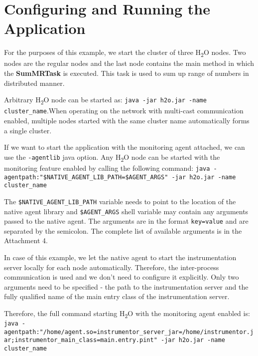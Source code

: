 \section{Configuring and Running the Application}
For the purposes of this example, we start the cluster of three H\textsubscript{2}O nodes. Two nodes are the regular nodes and the last node contains the main method in which the \textbf{SumMRTask} is executed. This task is used to sum up range of numbers in distributed manner.

Arbitrary H\textsubscript{2}O node can be started as: \newline \texttt{java -jar h2o.jar -name cluster\_name}.\newline When operating on the network with multi-cast communication enabled, multiple nodes started with the same cluster name automatically forms a single cluster.

If we want to start the application with the monitoring agent attached, we can use the \texttt{-agentlib} java option. Any H\textsubscript{2}O node can be started with the monitoring feature enabled by calling the following command: \newline
\texttt{java -agentpath:"\$NATIVE\_AGENT\_LIB\_PATH=\$AGENT\_ARGS" -jar h2o.jar  \newline -name cluster\_name}

The \texttt{\$NATIVE\_AGENT\_LIB\_PATH} variable needs to point to the location of the native agent library and \texttt{\$AGENT\_ARGS} shell variable may contain any arguments passed to the native agent. The arguments are in the format \texttt{key=value} and are separated by the semicolon. The complete list of available arguments is in the Attachment 4.

In case of this example, we let the native agent to start the instrumentation server locally for each node automatically. Therefore, the inter-process communication is used and we don't need to configure it explicitly. Only two arguments need to be specified - the path to the instrumentation server and the fully qualified name of the main entry class of the instrumentation server.

Therefore, the full command starting H\textsubscript{2}O with the monitoring agent enabled is: \newline
\texttt{java -agentpath:"/home/agent.so=instrumentor\_server\_jar=\newline/home/instrumentor.jar;instrumentor\_main\_class=main.entry.pint" \newline-jar h2o.jar -name cluster\_name}


